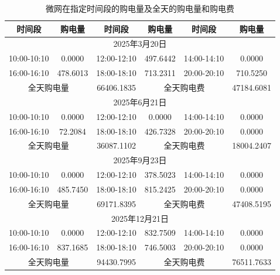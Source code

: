 \documentclass[withoutpreface,bwprint]{cumcmthesis}
\begin{document}
\begin{table}[h!]
	\centering
	\footnotesize
	\renewcommand{\arraystretch}{1.2}
	\setlength{\tabcolsep}{15pt}
	\caption{微网在指定时间段的购电量及全天的购电量和购电费}
	\label{tab:q43_spec_1}
	\begin{tabular}{|c|c|c|c|c|c|}
		\hline
		时间段 & 购电量 & 时间段 & 购电量 & 时间段 & 购电量 \\ \hline
		\multicolumn{6}{|c|}{2025年3月20日} \\ \hline
		10:00-10:10 & 0.0000 & 12:00-12:10 & 497.6442 & 14:00-14:10 & 0.0000 \\ \hline
		16:00-16:10 & 478.6013 & 18:00-18:10 & 713.2311 & 20:00-20:10 & 710.5250 \\ \hline
		\multicolumn{2}{|c|}{全天购电量} & 66406.1835 & \multicolumn{2}{c|}{全天购电费} & 47184.6081 \\ \hline
		\multicolumn{6}{|c|}{2025年6月21日} \\ \hline
		10:00-10:10 & 0.0000 & 12:00-12:10 & 0.0000 & 14:00-14:10 & 0.0000 \\ \hline
		16:00-16:10 & 72.2084 & 18:00-18:10 & 426.7328 & 20:00-20:10 & 0.0000 \\ \hline
		\multicolumn{2}{|c|}{全天购电量} & 36087.1102 & \multicolumn{2}{c|}{全天购电费} & 18004.2407 \\ \hline
		\multicolumn{6}{|c|}{2025年9月23日} \\ \hline
		10:00-10:10 & 0.0000 & 12:00-12:10 & 378.5023 & 14:00-14:10 & 0.0000 \\ \hline
		16:00-16:10 & 485.7450 & 18:00-18:10 & 815.2425 & 20:00-20:10 & 0.0000 \\ \hline
		\multicolumn{2}{|c|}{全天购电量} & 69171.8395 & \multicolumn{2}{c|}{全天购电费} & 47408.5195 \\ \hline
		\multicolumn{6}{|c|}{2025年12月21日} \\ \hline
		10:00-10:10 & 0.0000 & 12:00-12:10 & 832.7509 & 14:00-14:10 & 0.0000 \\ \hline
		16:00-16:10 & 837.1685 & 18:00-18:10 & 746.5003 & 20:00-20:10 & 0.0000 \\ \hline
		\multicolumn{2}{|c|}{全天购电量} & 94430.7995 & \multicolumn{2}{c|}{全天购电费} & 76511.7633 \\ \hline
	\end{tabular}
\end{table}
\end{document}
